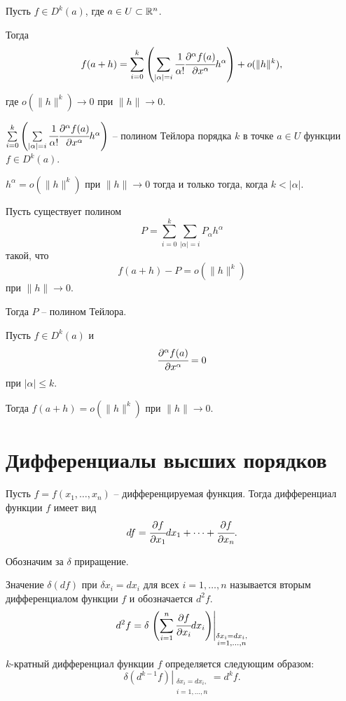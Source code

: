 	\begin{theorem}
		Пусть $f\in D^k(a)$, где $a\in U \subset \mathbb{R}^n$.
		
		Тогда
		$$
			f(a+h) = \sum\limits_{i=0}^k \left( \sum\limits_{|\alpha|=i} \cfrac {1}{\alpha!}  \cfrac {\partial^\alpha f(a)}{\partial x^\alpha} h^\alpha\right) + o(\|h\|^k),
		$$
		
		где $o(\|h\|^k) \to 0$ при $\|h\|\to 0$.
	\end{theorem}

	\begin{mdef}
		$
		\sum\limits_{i=0}^k \left( \sum\limits_{|\alpha|=i} \cfrac {1}{\alpha!}  \cfrac {\partial^\alpha f(a)}{\partial x^\alpha} h^\alpha\right)
		$ -- полином Тейлора порядка $k$ в точке $a\in U$ функции $f\in D^k(a)$.
	\end{mdef}

	\begin{lemma}
		$h^\alpha = o(\|h\|^k)$ при $\|h\|\to0$ тогда и только тогда, когда $k < |\alpha|$.
	\end{lemma}

	\begin{theorem}
		Пусть существует полином 
		$$
			P = \sum \limits_{i=0}^k \sum\limits_{|\alpha|=i} P_\alpha h^\alpha
		$$
		такой, что 
		$$
			f(a+h) - P = o(\|h\|^k)
		$$ при $\|h\|\to 0$.
		
		Тогда $P$ -- полином Тейлора.
	\end{theorem}
	
	\begin{corollary}
		Пусть $f\in D^k(a)$ и $$\cfrac {\partial^\alpha f(a)} {\partial x^\alpha} = 0$$ при $|\alpha| \le k$.
		
		Тогда $f(a+h) = o(\|h\|^k)$ при $\|h\|\to0$.
	\end{corollary}
	
	\section{Дифференциалы высших порядков}
	Пусть $f = f(x_1, \ldots, x_n)$ -- дифференцируемая функция.
	Тогда дифференциал функции $f$ имеет вид
	$$
		df = \cfrac {\partial f} {\partial x_1} dx_1 + \dots + \cfrac {\partial f} {\partial x_n}.	
	$$
	
	Обозначим за $\delta$ приращение.
	\begin{mdef}
		Значение $\delta(df)$ при $\delta x_i = dx_i$ для всех $i = 1,\ldots,n$ называется вторым дифференциалом функции $f$ и обозначается $d^2 f$.
		$$
			d^2 f = \delta \left. \left( \sum \limits_{i=1}^n \cfrac {\partial f}{\partial x_i}dx_i \right) \right|_{\substack{\delta x_i = dx_i, \\ i = 1,\ldots, n}}
		$$ 	
	\end{mdef}
	\begin{mdef}
		$k$-кратный дифференциал функции $f$ определяется следующим образом:
		$$
			\left.\delta(d^{k-1}f)\right|_{\substack{\delta x_i = dx_i, \\ i = 1,\ldots, n}} = d^k f.
		$$
	\end{mdef}

